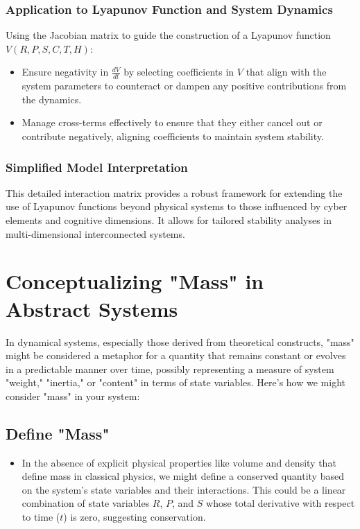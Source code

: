 \documentclass{article}
\begin{document}
\subsubsection*{Application to Lyapunov Function and System Dynamics}
Using the Jacobian matrix to guide the construction of a Lyapunov function \(V(R, P, S, C, T, H)\):
\begin{itemize}
    \item Ensure negativity in \(\frac{dV}{dt}\) by selecting coefficients in \(V\) that align with the system parameters to counteract or dampen any positive contributions from the dynamics.
    \item Manage cross-terms effectively to ensure that they either cancel out or contribute negatively, aligning coefficients to maintain system stability.
\end{itemize}

\subsubsection*{Simplified Model Interpretation}
This detailed interaction matrix provides a robust framework for extending the use of Lyapunov functions beyond physical systems to those influenced by cyber elements and cognitive dimensions. It allows for tailored stability analyses in multi-dimensional interconnected systems.
\section*{Conceptualizing "Mass" in Abstract Systems}

In dynamical systems, especially those derived from theoretical constructs, "mass" might be considered a metaphor for a quantity that remains constant or evolves in a predictable manner over time, possibly representing a measure of system "weight," "inertia," or "content" in terms of state variables. Here's how we might consider "mass" in your system:

\subsection*{Define "Mass"}
\begin{itemize}
  \item In the absence of explicit physical properties like volume and density that define mass in classical physics, we might define a conserved quantity based on the system's state variables and their interactions. This could be a linear combination of state variables \( R \), \( P \), and \( S \) whose total derivative with respect to time (\( t \)) is zero, suggesting conservation.
\end{itemize}
\end{document}
